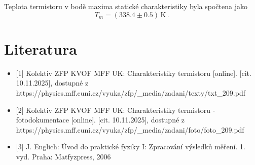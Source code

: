 \documentclass{../concepts/prepareprotokol} %
\begin{document}
Teplota termistoru v bodě maxima statické charakteristiky byla spočtena jako
\begin{equation*}
    T_m = (338.4 \pm 0.5) \, \si{\kelvin} \, .
\end{equation*}


\section*{Literatura}
\begin{itemize}
\item 

[1] Kolektiv ZFP KVOF MFF UK: Charakteristiky termistoru [online]. [cit. 10.11.2025], dostupné z https://physics.mff.cuni.cz/vyuka/zfp/\_media/zadani/texty/txt\_209.pdf

\item

[2] Kolektiv ZFP KVOF MFF UK: Charakteristiky termistoru -fotodokumentace [online]. [cit. 10.11.2025], dostupné z https://physics.mff.cuni.cz/vyuka/zfp/\_media/zadani/foto/foto\_209.pdf

\item 

[3] J. Englich: Úvod do praktické fyziky I: Zpracování výsledků měření. 1. vyd. Praha: Matfyzpress, 2006


\end{itemize}
\end{document}
